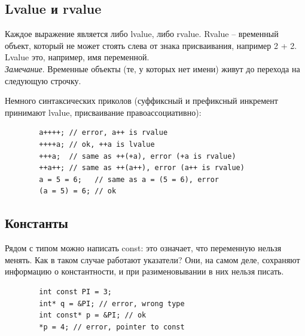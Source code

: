 \documentclass[12pt, a4paper]{article}
\begin{document}
	\subsection{Lvalue и rvalue}
	Каждое выражение является либо lvalue, либо rvalue. Rvalue -- временный объект, который не может стоять слева от знака присваивания, например 2 + 2. Lvalue это, например, имя переменной.\\
	\textit{Замечание}. Временные объекты (те, у которых нет имени) живут до перехода на следующую строчку.
	\\\par Немного синтаксических приколов (суффиксный и префиксный инкремент принимают lvalue, присваивание правоассоциативно):
	\begin{verbatim}
		a++++; // error, a++ is rvalue
		++++a; // ok, ++a is lvalue
		+++a;  // same as ++(+a), error (+a is rvalue)
		++a++; // same as ++(a++), error (a++ is rvalue)
		a = 5 = 6;   // same as a = (5 = 6), error
		(a = 5) = 6; // ok
	\end{verbatim}
	\subsection{Константы}
	Рядом с типом можно написать const: это означает, что переменную нельзя менять. Как в таком случае работают указатели? Они, на самом деле, сохраняют информацию о константности, и при разименовывании в них нельзя писать.
	\begin{verbatim}
		int const PI = 3;
		int* q = &PI; // error, wrong type
		int const* p = &PI; // ok
		*p = 4; // error, pointer to const
	\end{verbatim}
\end{document}
